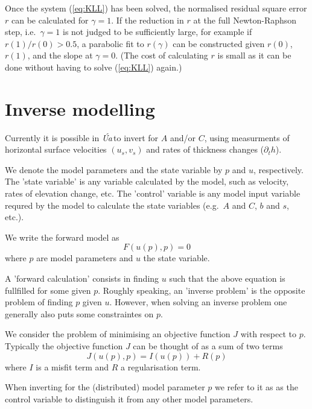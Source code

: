 \documentclass[10pt,a4paper]{book}
\newcommand{\p}{\partial}
\newcommand{\Ua}{\textsl{\'Ua}\,}
\begin{document}
Once the system (\ref{eq:KLL}) has been solved, the normalised
residual square error $r$ can be calculated for $\gamma=1$.  If the
reduction in $r$ at the full Newton-Raphson step, i.e.\ $\gamma=1$ is
not judged to be sufficiently large, for example if $r(1)/r(0)>0.5$, a
parabolic fit to $r(\gamma)$ can be constructed given $r(0)$, $r(1)$,
and the slope at $\gamma=0$. (The cost of calculating $r$ is small as
it can be done without having to solve (\ref{eq:KLL}) again.) 

\chapter{Inverse modelling}

Currently it is possible in \Ua to invert for $A$ and/or $C$, using
measurments of horizontal surface velocities $(u_s,v_s)$ and rates of
thickness changes ($\p_t h$).

We denote the model parameters and the state variable by $p$ and $u$,
respectively. The 'state variable' is any variable calculated by the
model, such as velocity, rates of elevation change, etc. The 'control'
variable is any model input variable requred by the model to calculate
the state variables (e.g.\ $A$ and $C$,  $b$ and $s$, etc.). 

We write the forward model as
\[
F(u(p),p)=0
\]
where $p$ are model parameters and $u$ the state variable.

A 'forward calculation' consists in finding $u$ such that the above
equation is fullfilled for some given $p$. Roughly speaking, an
'inverse problem' is the opposite problem of finding $p$ given
$u$. However, when solving an inverse problem one generally also puts
some constraintes on $p$.


We consider
the problem of minimising an objective function $J$ with respect to
$p$. Typically the objective function $J$ can be thought of as a sum of two terms
\[
 J(u(p),p)=I(u(p))+R(p)
\] 
where $I$ is a misfit term and $R$ a regularisation term. 

When inverting for the (distributed) model parameter $p$ we refer to it as as the
control variable to distinguish it from any other model parameters.
\end{document}
